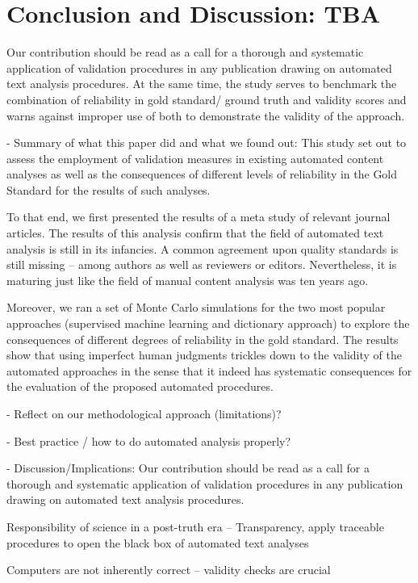 \documentclass[man, 12pt, a4paper, nolmodern, noextraspace]{apa6}
\begin{document}
\section{Conclusion and Discussion: TBA}

    Our contribution should be read as a call for a thorough and systematic application of validation procedures in any publication drawing on automated text analysis procedures. At the same time, the study serves to benchmark the combination of reliability in gold standard/ ground truth and validity scores and warns against improper use of both to demonstrate the validity of the approach.
    
    -	Summary of what this paper did and what we found out:
	This study set out to assess the employment of validation measures in existing automated content analyses as well as the consequences of different levels of reliability in the Gold Standard for the results of such analyses. 
	
	To that end, we first presented the results of a meta study of relevant journal articles. The results of this analysis confirm that the field of automated text analysis is still in its infancies. A common agreement upon quality standards is still missing – among authors as well as reviewers or editors. Nevertheless, it is maturing just like the field of manual content analysis was ten years ago.  
	
	Moreover, we ran a set of Monte Carlo simulations for the two most popular approaches (supervised machine learning and dictionary approach) to explore the consequences of different degrees of reliability in the gold standard. The results show that using imperfect human judgments trickles down to the validity of the automated approaches in the sense that it indeed has systematic consequences for the evaluation of the proposed automated procedures. 
	
-	Reflect on our methodological approach (limitations)? 

-	Best practice / how to do automated analysis properly? 

-	Discussion/Implications: 
	Our contribution should be read as a call for a thorough and systematic application of validation procedures in any publication drawing on automated text analysis procedures.
	
	Responsibility of science in a post-truth era --  Transparency, apply traceable procedures to open the black box of automated text analyses 
	
	Computers are not inherently correct -- validity checks are crucial
	
\end{document}
